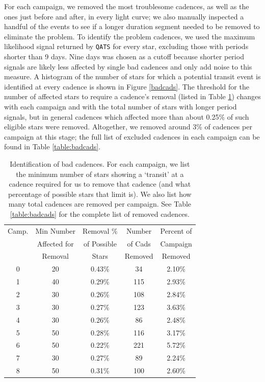 \documentclass[twocolumn]{aastex62}
\newcommand{\pipeline}[1]{\texttt{#1}}
\begin{document}
For each campaign, we removed the most troublesome cadences, as well
as the ones just before and after, in every light curve; we also
manually inspected a handful of the events to see if a longer duration
segment needed to be removed to eliminate the problem. To identify the
problem cadences, we used the maximum likelihood signal returned by
\pipeline{QATS} for every star, excluding those with periods shorter
than 9 days.  Nine days was chosen as a cutoff because shorter period
signals are likely less affected by single bad cadences and only add
noise to this measure. A histogram of the number of stars for which a
potential transit event is identified at every cadence is shown in
Figure \ref{badcads}. The threshold for the number of affected stars
to require a cadence's removal (listed in Table \ref{badcadstab})
changes with each campaign and with the total number of stars with
longer period signals, but in general cadences which affected more
than about 0.25\% of such eligible stars were removed. Altogether, we
removed around 3\% of cadences per campaign at this stage; the full
list of excluded cadences in each campaign can be found in Table
\ref{table:badcads}.

\begin{table}[tbp]
\footnotesize
\caption{Identification of bad cadences. For each campaign, we list
  the minimum number of stars showing a `transit' at a cadence
  required for us to remove that cadence (and what percentage of
  possible stars that limit is). We also list how many total cadences
  are removed per campaign. See Table \ref{table:badcads} for the
  complete list of removed cadences. \label{badcadstab}} \centering
\begin{tabular}{c c c c c}
\hline
Camp. & Min Number  & Removal \%  & Number  & Percent of \\
& Affected for & of Possible & of Cads & Campaign \\
 & Removal &  Stars & Removed & Removed \\
\hline
0 & 20 & 0.43\% & 34 & 2.10\% \\
1 & 40 & 0.29\% & 115 & 2.93\% \\
2 & 30 & 0.26\% & 108 & 2.84\% \\
3 & 30 & 0.27\% & 123 & 3.63\% \\
4 & 30 & 0.26\% & 86 & 2.48\% \\
5 & 50 & 0.28\% & 116 & 3.17\% \\
6 & 50 & 0.22\% & 221 & 5.72\% \\
7 & 30 & 0.27\% & 89 & 2.24\% \\
8 & 50 & 0.31\% & 100 & 2.60\% \\
\hline
\end{tabular}
\end{table}
\end{document}

